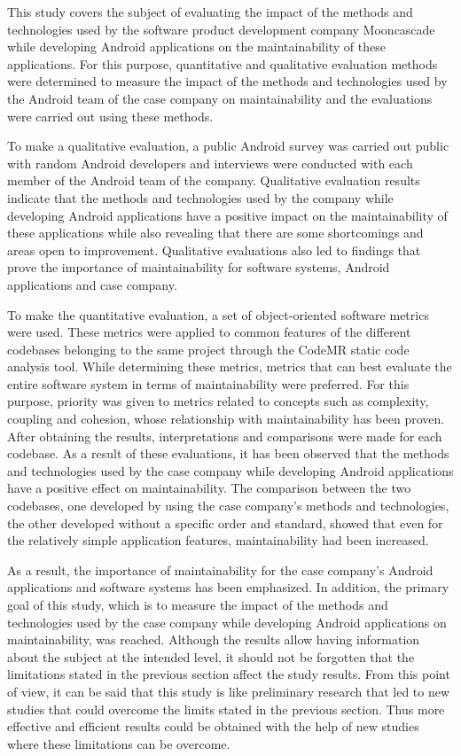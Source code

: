 This study covers the subject of evaluating the impact of the methods and technologies used by the software product development company Mooncascade while developing Android applications on the maintainability of these applications. For this purpose, quantitative and qualitative evaluation methods were determined to measure the impact of the methods and technologies used by the Android team of the case company on maintainability and the evaluations were carried out using these methods.

To make a qualitative evaluation, a public Android survey was carried out public with random Android developers and interviews were conducted with each member of the Android team of the company. Qualitative evaluation results indicate that the methods and technologies used by the company while developing Android applications have a positive impact on the maintainability of these applications while also revealing that there are some shortcomings and areas open to improvement. Qualitative evaluations also led to findings that prove the importance of maintainability for software systems, Android applications and case company.

To make the quantitative evaluation, a set of object-oriented software metrics were used. These metrics were applied to common features of the different codebases belonging to the same project through the CodeMR static code analysis tool. While determining these metrics, metrics that can best evaluate the entire software system in terms of maintainability were preferred. For this purpose, priority was given to metrics related to concepts such as complexity, coupling and cohesion, whose relationship with maintainability has been proven. After obtaining the results, interpretations and comparisons were made for each codebase. As a result of these evaluations, it has been observed that the methods and technologies used by the case company while developing Android applications have a positive effect on maintainability. The comparison between the two codebases, one developed by using the case company's methods and technologies, the other developed without a specific order and standard, showed that even for the relatively simple application features, maintainability had been increased.

As a result, the importance of maintainability for the case company's Android applications and software systems has been emphasized. In addition, the primary goal of this study, which is to measure the impact of the methods and technologies used by the case company while developing Android applications on maintainability, was reached. Although the results allow having information about the subject at the intended level, it should not be forgotten that the limitations stated in the previous section affect the study results. From this point of view, it can be said that this study is like preliminary research that led to new studies that could overcome the limits stated in the previous section. Thus more effective and efficient results could be obtained with the help of new studies where these limitations can be overcome.